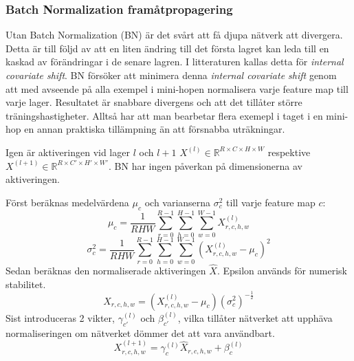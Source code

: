 \documentclass[a4paper,11pt,twoside]{article}
\begin{document}
\subsubsection{Batch Normalization framåtpropagering}
Utan Batch Normalization (BN) är det svårt att få djupa nätverk att divergera. Detta är till följd av att en liten ändring till det första lagret kan leda till en kaskad av förändringar i de senare lagren. I litteraturen kallas detta för \textit{internal covariate shift}. BN försöker att minimera denna \textit{internal covariate shift} genom att med avseende på alla exempel i mini-hopen normalisera varje feature map till varje lager. Resultatet är snabbare divergens och att det tillåter större träningshastigheter. Alltså har att man bearbetar flera exemepl i taget i en mini-hop en annan praktiska tillämpning än att försnabba uträkningar. \cite{cs231n} \cite{batchnorm}

Igen är aktiveringen vid lager $l$ och $l+1$ $X^{(l)} \in \mathbb{R}^{R \times C \times H \times W}$ respektive $X^{(l+1)} \in \mathbb{R}^{R \times C' \times H' \times W'}$. BN har ingen påverkan på dimensionerna av aktiveringen. \cite{cs231n} \cite{batchnorm}

Först beräknas medelvärdena $\mu_c$ och varianserna $\sigma^2_c$ till varje feature map $c$: \cite{cs231n} \cite{batchnorm}
\begin{equation}
\mu_c = \frac{1}{RHW} \sum^{R-1}_{r=0} \sum^{H-1}_{h=0} \sum^{W-1}_{w=0} X^{(l)}_{r,c,h,w}
\end{equation}
\begin{equation}
\sigma^2_c  = \frac{1}{RHW} \sum^{R-1}_{r=0} \sum^{H-1}_{h=0} \sum^{W-1}_{w=0} ({X^{(l)}_{r,c,h,w} - \mu_c})^2
\end{equation}
Sedan beräknas den normaliserade aktiveringen $\hat{X}$. Epsilon används för numerisk stabilitet. \cite{cs231n} \cite{batchnorm}
\begin{equation}
\hat{X}_{r,c,h,w} = (X^{(l)}_{r,c,h,w} - \mu_c){(\sigma^2_c)}^{-\frac{1}{2}}
\end{equation}
Sist introduceras 2 vikter, $\gamma_{c'}^{(l)}$ och $\beta_{c'}^{(l)}$, vilka tillåter nätverket att upphäva normaliseringen om nätverket dömmer det att vara användbart. \cite{cs231n} \cite{batchnorm}
\begin{equation}
X^{(l+1)}_{r,c,h,w} = \gamma_{c}^{(l)} \hat{X}_{r,c,h,w} + \beta_{c}^{(l)}
\end{equation}
\end{document}

